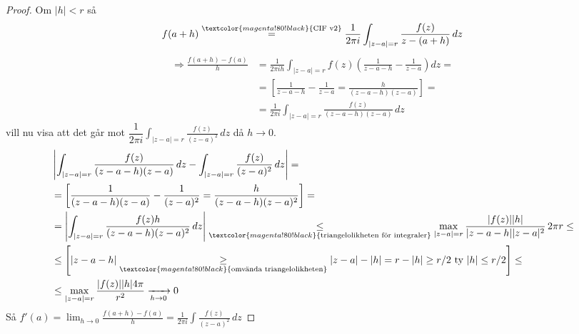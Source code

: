 \begin{proof}
Om $|h| < r$ så
\[ f(a + h) \overset{\textcolor{magenta!80!black}{\text{CIF v2}}}{=} \frac{1}{2\pi i}\int_{|z - a| = r} \frac{f(z)}{z - (a + h)}\,dz \]
\begin{align*}
\Rightarrow \frac{f(a + h) - f(a)}{h} &= \frac{1}{2\pi ih}\int_{|z - a| = r} f(z)\left( \frac{1}{z - a - h} - \frac{1}{z - a} \right) dz = \\
&= \left[ \frac{1}{z - a - h} - \frac{1}{z - a} = \frac{h}{(z - a - h)(z - a)} \right] = \\
&= \frac{1}{2\pi i}\int_{|z - a| = r} \frac{f(z)}{(z - a - h)(z - a)}\,dz
\end{align*}
vill nu visa att det går mot $\dfrac{1}{2\pi i}\displaystyle\int_{|z - a| = r} \frac{f(z)}{(z - a)^2}\,dz$ då $h \to 0$.
\begin{align*}
&\left| \int_{|z - a| = r} \frac{f(z)}{(z - a - h)(z - a)}\,dz - \int_{|z - a| = r} \frac{f(z)}{(z - a)^2}\,dz \right| = \\
&= \left[ \frac{1}{(z - a - h)(z - a)} - \frac{1}{(z - a)^2} = \frac{h}{(z - a - h)(z - a)^2} \right] = \\
&= \left| \int_{|z - a| = r} \frac{f(z)h}{(z - a - h)(z - a)^2}\,dz \right| \underset{\textcolor{magenta!80!black}{\text{triangelolikheten för integraler}}}{\le} \max_{|z - a| = r} \frac{|f(z)||h|}{|z - a - h||z - a|^2}\,2\pi r \le \\
&\le \left[ |z - a - h| \underset{\textcolor{magenta!80!black}{\text{omvända triangelolikheten}}}{\ge} |z - a| - |h| = r - |h| \ge r/2 \text{ ty } |h| \le r/2 \right] \le \\
&\le \max_{|z - a| = r} \frac{|f(z)||h|4\pi}{r^2} \xrightarrow[h \to 0]{} 0
\end{align*}
Så $f'(a) = \displaystyle\lim_{h \to 0} \frac{f(a + h) - f(a)}{h} = \frac{1}{2\pi i}\int \frac{f(z)}{(z - a)^2}\,dz$
\end{proof}
